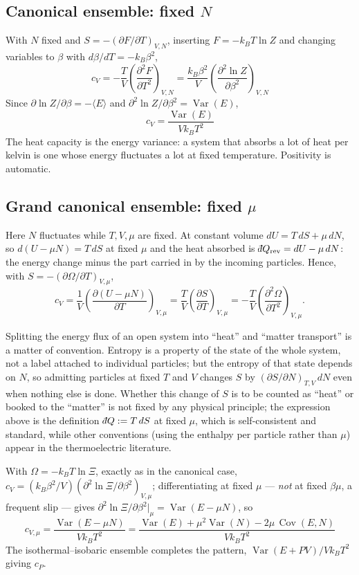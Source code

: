 \documentclass[10pt,a4paper]{article}
\theoremstyle{remark}
\newcommand{\dbar}{\mathchar'26\mkern-11mu d}
\newcommand{\Var}{\operatorname{Var}}
\newcommand{\Cov}{\operatorname{Cov}}
\begin{document}
\subsection{Canonical ensemble: fixed \texorpdfstring{$N$}{N}}

With $N$ fixed and $S=-(\partial F/\partial T)_{V,N}$, inserting $F=-k_BT\ln Z$
and changing variables to $\beta$ with $d\beta/dT=-k_B\beta^{2}$,
\[
\;c_V=-\frac{T}{V}\left(\frac{\partial^2F}{\partial T^2}\right)_{V,N}
=\frac{k_B\beta^{2}}{V}
\left(\frac{\partial^{2}\ln Z}{\partial\beta^{2}}\right)_{V,N}\
\]
Since $\partial\ln Z/\partial\beta=-\langle E\rangle$ and
$\partial^{2}\ln Z/\partial\beta^{2}=\Var(E)$,
\[
\;c_V=\frac{\Var(E)}{Vk_BT^{2}}\
\]
The heat capacity is the energy variance: a system that absorbs a lot of heat per
kelvin is one whose energy fluctuates a lot at fixed temperature. Positivity is
automatic.

\subsection{Grand canonical ensemble: fixed \texorpdfstring{$\mu$}{mu}}

Here $N$ fluctuates while $T,V,\mu$ are fixed. At constant volume
$dU=T\,dS+\mu\,dN$, so $d(U-\mu N)=T\,dS$ at fixed $\mu$ and the heat absorbed is
$\dbar Q_{\rm rev}=dU-\mu\,dN$: the energy change minus the part carried in by
the incoming particles. Hence, with $S=-(\partial\Omega/\partial T)_{V,\mu}$,
\[
c_V=\frac{1}{V}\left(\frac{\partial (U-\mu N)}{\partial T}\right)_{V,\mu}
=\frac{T}{V}\left(\frac{\partial S}{\partial T}\right)_{V,\mu}
=-\frac{T}{V}\left(\frac{\partial^{2}\Omega}{\partial T^{2}}\right)_{V,\mu} .
\]

Splitting the energy flux of an open system into ``heat'' and ``matter transport''
is a matter of convention. Entropy is a property of the state of the whole system,
not a label attached to individual particles; but the entropy of that state
depends on $ N $, so admitting particles at fixed $ T $ and $ V $ changes $ S $ by
$ (\partial S/\partial N)_{T,V}\,dN $ even when nothing else is done. Whether this
change of $ S $ is to be counted as ``heat'' or booked to the ``matter'' is not
fixed by any physical principle; the expression above is the definition $\dbar Q:= T\,dS$
at fixed $\mu$, which is self-consistent and standard, while other conventions
(using the enthalpy per particle rather than $\mu$) appear in the
thermoelectric literature.

With $\Omega=-k_BT\ln\Xi$, exactly as in the canonical case,
$c_V=(k_B\beta^{2}/V)(\partial^{2}\ln\Xi/\partial\beta^{2})_{V,\mu}$;
differentiating at fixed $\mu$ --- \emph{not} at fixed $\beta\mu$, a frequent
slip --- gives $\partial^{2}\ln\Xi/\partial\beta^{2}|_{\mu}=\Var(E-\mu N)$, so
\[
\;c_{V,\mu}=\frac{\Var(E-\mu N)}{Vk_BT^{2}}
=\frac{\Var(E)+\mu^{2}\Var(N)-2\mu\,\Cov(E,N)}{Vk_BT^{2}}\
\]
The isothermal--isobaric ensemble completes the pattern, $\Var(E+PV)/Vk_BT^{2}$
giving $c_P$.
\end{document}
